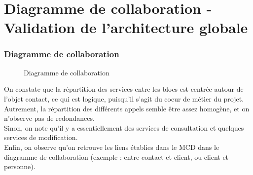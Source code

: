 \part{Diagramme de collaboration - Validation de l'architecture globale}
\setcounter{section}{0}

\section{Diagramme de collaboration}
\begin{figure}[H]
\noindent{}
\caption{Diagramme de collaboration}
\end{figure}

On constate que la répartition des services entre les blocs est centrée autour de l'objet contact, ce qui est logique, puisqu'il s'agit du coeur de métier du projet. Autrement, la répartition des différents appels semble être assez homogène, et on n'observe pas de redondances.\\

Sinon, on note qu'il y a essentiellement des services de consultation et quelques services de modification. \\ 
Enfin, on observe qu'on retrouve les liens établies dans le MCD dans le diagramme de collaboration (exemple : entre contact et client, ou client et personne). 



